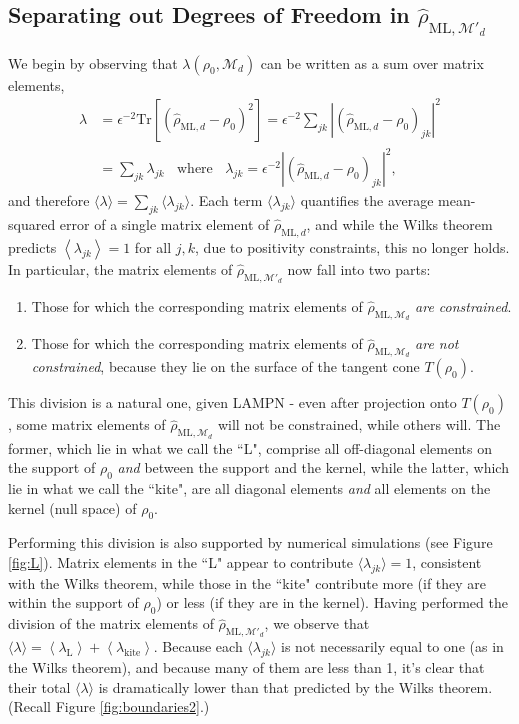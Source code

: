 \documentclass[aps,pra, twocolumn]{revtex4-1}
\newcommand{\M}{\mathcal{M}}
\newcommand{\expect}[1]{\ensuremath{\left\langle#1\right\rangle}}
\newcommand{\rhohat}{\hat{\rho}}
\newcommand{\rhoML}[1]{\rhohat_{\scriptscriptstyle{\mathrm{ML},#1}}}
\begin{document}
\subsection{Separating out Degrees of Freedom in $\rhoML{\M'_{d}}$}
\label{subsec:dof}
We begin by observing that $\lambda(\rho_{0}, \M_{d})$ can be written as a sum over matrix elements,
\begin{align}
\label{eq:llrserrors}
\nonumber \lambda &=\epsilon^{-2}\mathrm{Tr}[(\rhoML{d} - \rho_{0})^{2}] = \epsilon^{-2}\sum_{jk}|(\rhoML{d}- \rho_{0} )_{jk}|^{2}\\
&= \sum_{jk}\lambda_{jk}~~~~\text{where}~~~~\lambda_{jk} = \epsilon^{-2}|(\rhoML{d} - \rho_{0} )_{jk} |^{2},
\end{align}
and therefore $\langle \lambda \rangle = \sum_{jk}\langle\lambda_{jk}\rangle$.  Each term $\langle \lambda_{jk}\rangle$ quantifies the average mean-squared error of a single matrix element of $\rhoML{d}$, and while the Wilks theorem predicts $\expect{\lambda_{jk}}=1$ for all $j,k$, due to positivity constraints, this no longer holds. In particular, the matrix elements of $\rhoML{\M'_{d}}$ now fall into two parts:

\begin{enumerate}[noitemsep]
\item Those for which the corresponding matrix elements of $\rhoML{\M_{d}}$ \emph{are constrained}.
\item Those for which the corresponding matrix elements of $\rhoML{\M_{d}}$ \emph{are not constrained}, because they lie on the surface of the tangent cone $T(\rho_{0})$.
\end{enumerate}
This division is a natural one, given LAMPN - even after projection onto $T(\rho_{0})$ , some matrix elements of $\rhoML{\M_{d}}$ will not be constrained, while others will. The former, which lie in what we call the ``L", comprise all off-diagonal elements on the support of $\rho_0$ \emph{and} between the support and the kernel, while the latter, which lie in what we call the ``kite", are all diagonal elements \emph{and} all elements on the kernel (null space) of $\rho_0$.

Performing this division is also supported by numerical simulations (see Figure \ref{fig:L}). Matrix elements in the ``L" appear to contribute $\langle \lambda_{jk}\rangle = 1$, consistent with the Wilks theorem, while those in the ``kite" contribute more (if they are within the support of $\rho_{0}$) or less (if they are in the kernel).  Having performed the division of the matrix elements of $\rhoML{\M'_{d}}$, we observe that $\langle\lambda\rangle = \expect{\lambda_{\mathrm{L}}} + \expect{\lambda_{\mathrm{kite}}}$. Because each $\langle \lambda_{jk}\rangle$ is not necessarily equal to one (as in the Wilks theorem), and because many of them are less than 1, it's clear that their total $\langle \lambda \rangle$ is dramatically lower than that predicted by the Wilks theorem. (Recall Figure \ref{fig:boundaries2}.)
\end{document}
